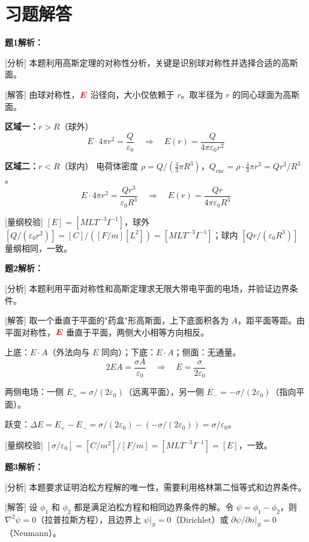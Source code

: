\documentclass[11pt,a4paper,openany,oneside]{book}
\newcommand{\vecE}{\textcolor{red}{\vect{E}}}
\newcommand{\eps}{\varepsilon}
\newcommand{\vect}[1]{\bm{#1}}
\newcommand{\lap}{\nabla^2}
\begin{document}
\section*{习题解答}

\textbf{题1解析：}

[分析] 本题利用高斯定理的对称性分析，关键是识别球对称性并选择合适的高斯面。

[解答] 由球对称性，$\vecE$ 沿径向，大小仅依赖于 $r$。取半径为 $r$ 的同心球面为高斯面。

\textbf{区域一：$r > R$}（球外）
\[
E \cdot 4\pi r^2 = \frac{Q}{\eps_0} \quad\Rightarrow\quad E(r) = \frac{Q}{4\pi\eps_0 r^2}
\]

\textbf{区域二：$r < R$}（球内）
电荷体密度 $\rho = Q/(\frac{4}{3}\pi R^3)$，$Q_{\text{enc}} = \rho \cdot \frac{4}{3}\pi r^3 = Qr^3/R^3$。
\[
E \cdot 4\pi r^2 = \frac{Qr^3}{\eps_0 R^3} \quad\Rightarrow\quad E(r) = \frac{Qr}{4\pi\eps_0 R^3}
\]

[量纲校验] $[E] = [MLT^{-3}I^{-1}]$，球外 $[Q/(\eps_0 r^2)] = [C]/([F/m][L^2]) = [MLT^{-3}I^{-1}]$；球内 $[Qr/(\eps_0 R^3)]$ 量纲相同，一致。\qedsymbol

\textbf{题2解析：}

[分析] 本题利用平面对称性和高斯定理求无限大带电平面的电场，并验证边界条件。

[解答] 取一个垂直于平面的"药盒"形高斯面，上下底面积各为 $A$，距平面等距。由平面对称性，$\vecE$ 垂直于平面，两侧大小相等方向相反。

上底：$E \cdot A$（外法向与 $E$ 同向）；下底：$E \cdot A$；侧面：无通量。
\[
2EA = \frac{\sigma A}{\eps_0} \quad\Rightarrow\quad E = \frac{\sigma}{2\eps_0}
\]

两侧电场：一侧 $E_+ = \sigma/(2\eps_0)$（远离平面），另一侧 $E_- = -\sigma/(2\eps_0)$（指向平面）。

跃变：$\Delta E = E_+ - E_- = \sigma/(2\eps_0) - (-\sigma/(2\eps_0)) = \sigma/\eps_0$。\qedsymbol

[量纲校验] $[\sigma/\eps_0] = [C/m^2]/[F/m] = [MLT^{-3}I^{-1}] = [E]$，一致。\qedsymbol

\textbf{题3解析：}

[分析] 本题要求证明泊松方程解的唯一性，需要利用格林第二恒等式和边界条件。

[解答] 设 $\phi_1$ 和 $\phi_2$ 都是满足泊松方程和相同边界条件的解。令 $\psi = \phi_1 - \phi_2$，则 $\lap\psi = 0$（拉普拉斯方程），且边界上 $\psi|_S = 0$（Dirichlet）或 $\partial\psi/\partial n|_S = 0$（Neumann）。
\end{document}
